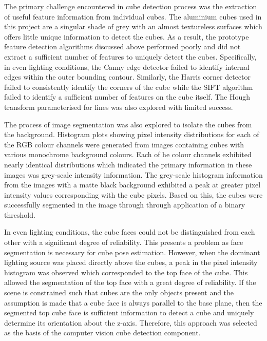The primary challenge encountered in cube detection process was the extraction of useful feature information from individual cubes. The aluminium cubes used in this project are a singular shade of grey with an almost textureless surfaces which offers little unique information to detect the cubes. As a result, the prototype feature detection algorithms discussed above performed poorly and did not extract a sufficient number of features to uniquely detect the cubes. Specifically, in even lighting conditions, the Canny edge detector failed to identify internal edges within the outer bounding contour. Similarly, the Harris corner detector failed to consistently identify the corners of the cube while the SIFT algorithm failed to identify a sufficient number of features on the cube itself. The Hough transform parameterised for lines was also explored with limited success.  

The process of image segmentation was also explored to isolate the cubes from the background. Histogram plots showing pixel intensity distributions for each of the RGB colour channels were generated from images containing cubes with various monochrome background colours. Each of he colour channels exhibited nearly identical distributions which indicated the primary information in these images was grey-scale intensity information. The grey-scale histogram information from the images with a matte black background exhibited a peak at greater pixel intensity values corresponding with the cube pixels. Based on this, the cubes were successfully segmented in the image through through application of a binary threshold. 

In even lighting conditions, the cube faces could not be distinguished from each other with a significant degree of reliability. This presents a problem as face segmentation is necessary for cube pose estimation. However, when the dominant lighting source was placed directly above the cubes, a peak in the pixel intensity histogram was observed which corresponded to the top face of the cube. This allowed the segmentation of the top face with a great degree of reliability. If the scene is constrained such that cubes are the only objects present and the assumption is made that a cube face is always parallel to the base plane, then the segmented top cube face is sufficient information to detect a cube and uniquely determine its orientation about the z-axis. Therefore, this approach was selected as the basis of the computer vision cube detection component.

